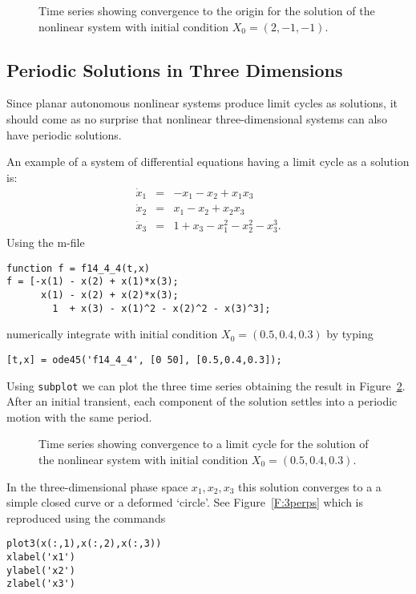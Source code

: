 \begin{figure}[htb]
   \centerline{%
   }
   \caption{Time series showing convergence to the origin for the solution of 
	the nonlinear system \protect{} with initial condition 
	$X_0=(2,-1,-1)$.}
   \label{F:fnonlin3}
\end{figure}
 
\subsection*{Periodic Solutions in Three Dimensions}

Since planar autonomous nonlinear systems produce limit cycles as solutions, 
it should come as no surprise that nonlinear three-dimensional systems can 
also have periodic solutions.  

An example of a system of differential equations having a limit cycle as a 
solution is:
\begin{equation*} \label{E:3per}
\begin{array}{rcl}
\dot{x}_1 & = & -x_1 - x_2 + x_1x_3 \\
\dot{x}_2 & = &  x_1 - x_2 + x_2x_3 \\
\dot{x}_3 & = &  1 + x_3 - x_1^2 - x_2^2 - x_3^3.
\end{array}
\end{equation*}
Using the m-file
\begin{verbatim}
function f = f14_4_4(t,x)
f = [-x(1) - x(2) + x(1)*x(3); 
      x(1) - x(2) + x(2)*x(3); 
        1  + x(3) - x(1)^2 - x(2)^2 - x(3)^3];
\end{verbatim}
numerically integrate  with initial condition
$X_0=(0.5,0.4,0.3)$ by typing
\begin{verbatim}
[t,x] = ode45('f14_4_4', [0 50], [0.5,0.4,0.3]);
\end{verbatim}
Using {\tt subplot} we can plot the three time series obtaining the result in 
Figure~\ref{F:3per}.  After an initial transient, each component of the 
solution settles into a periodic motion with the same period.
\begin{figure}[htb]
   \centerline{%
   }
   \caption{Time series showing convergence to a limit cycle for the solution 
	of the nonlinear system \protect{} with initial condition 
	$X_0=(0.5,0.4,0.3)$.}
   \label{F:3per}
\end{figure}

In the three-dimensional phase space $x_1,x_2,x_3$ this solution converges to a 
a simple closed curve or a deformed `circle'.  See Figure~\ref{F:3perps} 
which is reproduced using the \Matlab commands
\begin{verbatim}
plot3(x(:,1),x(:,2),x(:,3))                  
xlabel('x1')
ylabel('x2')
zlabel('x3')
\end{verbatim}

